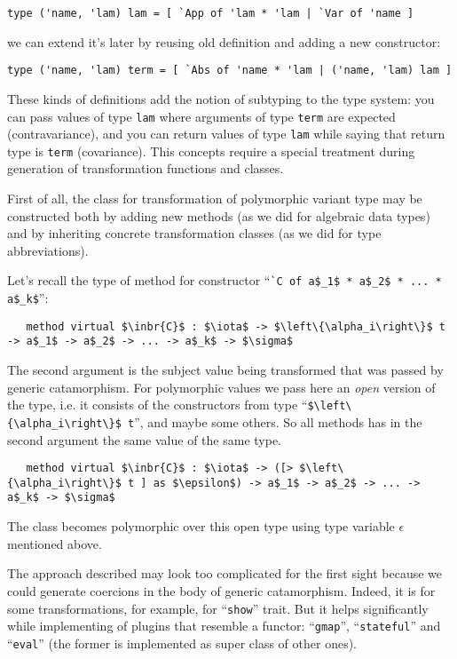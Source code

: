 \begin{lstlisting}
type ('name, 'lam) lam = [ `App of 'lam * 'lam | `Var of 'name ]
\end{lstlisting}

we can extend it's later by reusing old definition and adding a new constructor:
\begin{lstlisting}
type ('name, 'lam) term = [ `Abs of 'name * 'lam | ('name, 'lam) lam ]
\end{lstlisting}

These kinds of definitions add the notion of subtyping to the type system: you can pass values of type \lstinline=lam= where arguments of type \lstinline=term= are expected (contravariance), and you can return values of type \lstinline=lam= while saying that return type is \lstinline=term= (covariance). This concepts require a special treatment during generation of transformation functions and classes.

First of all, the class for transformation of polymorphic variant type may be constructed both by adding new methods (as we did for algebraic data types) and by inheriting concrete transformation classes (as we did for type abbreviations).

Let's recall the type of method for constructor ``\lstinline|`C of a$_1$ * a$_2$ * ... * a$_k$|'':
\begin{lstlisting}
   method virtual $\inbr{C}$ : $\iota$ -> $\left\{\alpha_i\right\}$ t -> a$_1$ -> a$_2$ -> ... -> a$_k$ -> $\sigma$
\end{lstlisting}

The second argument is the subject value being transformed that was passed  by generic catamorphism. For polymorphic values we pass here 
an \emph{open} version of the type, i.e. it consists of the constructors from type ``\lstinline|$\left\{\alpha_i\right\}$ t|'', and maybe some others. So all methods has in the second argument the same value of the same type.

\begin{lstlisting}
   method virtual $\inbr{C}$ : $\iota$ -> ([> $\left\{\alpha_i\right\}$ t ] as $\epsilon$) -> a$_1$ -> a$_2$ -> ... -> a$_k$ -> $\sigma$
\end{lstlisting}

The class becomes polymorphic over this open type using type variable $\epsilon$ mentioned above.

The approach described may look too complicated for the first sight because we could generate coercions in the body of generic catamorphism. Indeed, it is for some transformations, for example, for ``\lstinline|show|'' trait. But it helps significantly while implementing of plugins that resemble a functor: ``\lstinline|gmap|'', ``\lstinline|stateful|'' and ``\lstinline|eval|'' (the former is implemented as super class of other ones). 


